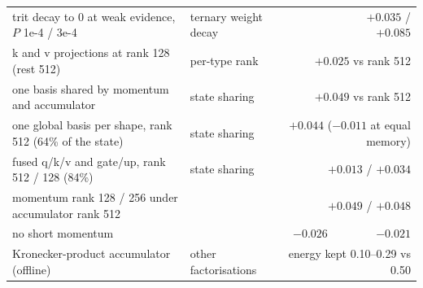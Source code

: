 \documentclass[10pt,twocolumn]{article}
\begin{document}
\begin{table}[t]
{\begin{tabular}{llrr}
trit decay to 0 at weak evidence, $P$ 1e-4 / 3e-4 & ternary weight decay & & $+0.035$ / $+0.085$ \\
k and v projections at rank 128 (rest 512) & per-type rank & \multicolumn{2}{r}{$+0.025$ vs rank 512} \\
one basis shared by momentum and accumulator & state sharing & \multicolumn{2}{r}{$+0.049$ vs rank 512} \\
one global basis per shape, rank 512 (64\% of the state) & state sharing & \multicolumn{2}{r}{$+0.044$ ($-0.011$ at equal memory)} \\
fused q/k/v and gate/up, rank 512 / 128 (84\%) & state sharing & \multicolumn{2}{r}{$+0.013$ / $+0.034$} \\
momentum rank 128 / 256 under accumulator rank 512 & & \multicolumn{2}{r}{$+0.049$ / $+0.048$} \\
no short momentum & & $-0.026$ & $-0.021$ \\
Kronecker-product accumulator (offline) & other factorisations & \multicolumn{2}{r}{energy kept 0.10--0.29 vs 0.50} \\
\bottomrule
\end{tabular}}
\end{table}
\end{document}
